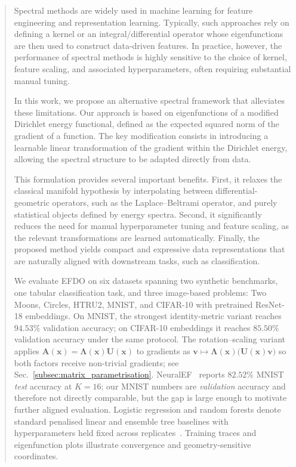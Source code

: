 \documentclass{article}
\theoremstyle{plain}
\theoremstyle{definition}
\theoremstyle{remark}
\newcommand{\new}[1]{#1}
\begin{document}
\begin{abstract}

Spectral methods are widely used in machine learning for feature engineering and representation learning. Typically, such approaches rely on defining a kernel or an integral/differential operator whose eigenfunctions are then used to construct data-driven features. In practice, however, the performance of spectral methods is highly sensitive to the choice of kernel, feature scaling, and associated hyperparameters, often requiring substantial manual tuning.

In this work, we propose an alternative spectral framework that alleviates these limitations. Our approach is based on eigenfunctions of a modified Dirichlet energy functional, defined as the expected squared norm of the gradient of a function. The key modification consists in introducing a learnable linear transformation of the gradient within the Dirichlet energy, allowing the spectral structure to be adapted directly from data.

This formulation provides several important benefits. First, it relaxes the classical manifold hypothesis by interpolating between differential-geometric operators, such as the Laplace–Beltrami operator, and purely statistical objects defined by energy spectra. Second, it significantly reduces the need for manual hyperparameter tuning and feature scaling, as the relevant transformations are learned automatically. Finally, the proposed method yields compact and expressive data representations that are naturally aligned with downstream tasks, such as classification.

\new{We evaluate EFDO on six datasets spanning two synthetic benchmarks, one tabular classification task, and three image-based problems: Two Moons, Circles, HTRU2, MNIST, and CIFAR-10 with pretrained ResNet-18 embeddings.
On MNIST, the strongest identity-metric variant reaches \(94.53\%\) validation accuracy; on CIFAR-10 embeddings it reaches \(85.50\%\) validation accuracy under the same protocol.
The rotation--scaling variant applies $\mathbf{A}(\mathbf{x}){=}\boldsymbol{\Lambda}(\mathbf{x})\mathbf{U}(\mathbf{x})$ to gradients as $\mathbf{v}{\mapsto}\boldsymbol{\Lambda}(\mathbf{x})\big(\mathbf{U}(\mathbf{x})\mathbf{v}\big)$ so both factors receive non-trivial gradients; see Sec.~\ref{subsec:matrix_parametrisation}.
NeuralEF~\citep{pmlr-v162-deng22b} reports \(82.52\%\) MNIST \emph{test} accuracy at $K{=}16$; our MNIST numbers are \emph{validation} accuracy and therefore not directly comparable, but the gap is large enough to motivate further aligned evaluation.
Logistic regression and random forests denote standard penalised linear and ensemble tree baselines with hyperparameters held fixed across replicates~\citep{scikit-learn}.
Training traces and eigenfunction plots illustrate convergence and geometry-sensitive coordinates.}

\end{abstract}
\end{document}
